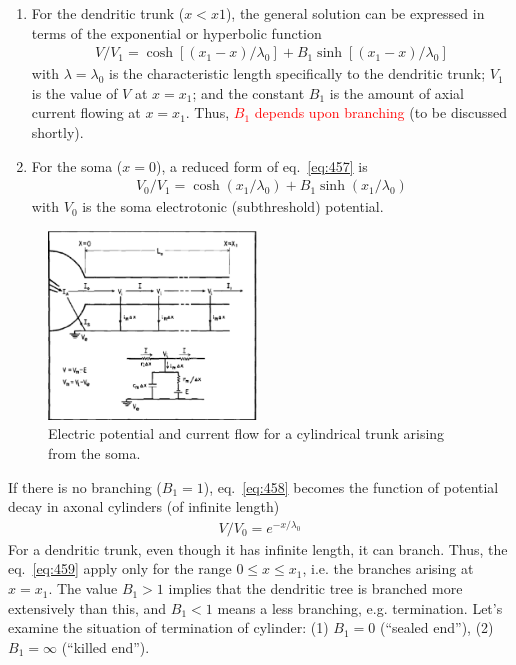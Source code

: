 \begin{enumerate}
\item For the dendritic trunk ($x<x1$), the general solution can be
  expressed in terms of the exponential or hyperbolic function
\begin{eqnarray}
  \label{eq:457}
  V/V_1 = \cosh\left[ (x_1-x)/\lambda_0 \right] + 
  B_1 \sinh \left[ (x_1-x)/\lambda_0\right]
\end{eqnarray}
with $\lambda=\lambda_0$ is the characteristic length specifically to
the dendritic trunk; $V_1$ is the value of $V$ at $x=x_1$; and the
constant $B_1$ is the amount of axial current flowing at
$x=x_1$. Thus,
\textcolor{red}{$B_1$ depends upon branching} (to be discussed
  shortly).

\item For the soma ($x=0$), a reduced form of eq.~\eqref{eq:457} is
  \begin{eqnarray}
    \label{eq:458}
    V_0/V_1 = \cosh (x_1/\lambda_0) + B_1 \sinh (x_1/\lambda_0)
  \end{eqnarray}
  with $V_0$ is the soma electrotonic (subthreshold) potential.
\end{enumerate}
\begin{figure}[hbt]
  \centerline{\includegraphics[height=5cm,
    angle=0]{./images/lumped_soma.eps}}
\caption{Electric potential and current flow for a cylindrical trunk
  arising from the soma.}
\label{fig:lumped_soma}
\end{figure}

If there is no branching ($B_1=1$), eq.~\eqref{eq:458} becomes the
function of potential decay in axonal cylinders (of infinite length)
\begin{eqnarray}
  \label{eq:459}
  V/V_0 = e^{-x/\lambda_0}
\end{eqnarray}
For a dendritic trunk, even though it has infinite length, it can
branch. Thus, the eq.~\eqref{eq:459} apply only for the range 
$0\le x\le x_1$, i.e. the branches arising at $x=x_1$. 
The value $B_1>1$
implies that the dendritic tree is branched more extensively than
this, and $B_1<1$ means a less branching, e.g. termination. Let's
examine the situation of termination of cylinder: (1) $B_1=0$
(``sealed end''), (2) $B_1=\infty$ (``killed end'').

